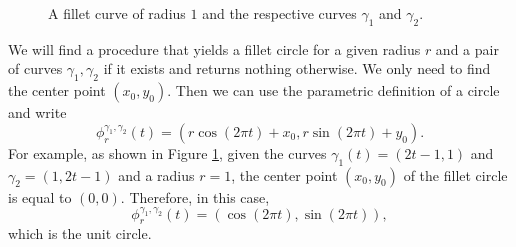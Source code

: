 \documentclass[a4paper, 11pt]{report}
\theoremstyle{definition}
\begin{document}
	\begin{figure}[H]
		\centering
		
		\caption{A fillet curve of radius $1$ and the respective curves $\gamma_1$ and $\gamma_2$.}
		\label{fig:verysimplefillet}
	\end{figure}

	We will find a procedure that yields a fillet circle for a given radius $r$ and a pair of curves $\gamma_1, \gamma_2$ if it exists and returns nothing otherwise. We only need to find the center point $(x_0, y_0)$. Then we can use the parametric definition of a circle and write
		$$ \phi^{\gamma_1, \gamma_2}_r(t) = (r \cos(2 \pi t) + x_0, r \sin(2 \pi t) + y_0).$$
	For example, as shown in Figure \ref{fig:verysimplefillet}, given the curves $\gamma_1(t) = (2t-1,1)$ and $\gamma_2 = (1,2t-1)$ and a radius $r = 1$, the center point $(x_0,y_0)$ of the fillet circle is equal to $(0,0)$. Therefore, in this case,
		$$ \phi^{\gamma_1, \gamma_2}_r(t) = (\cos(2\pi t), \sin(2\pi t)), $$
	which is the unit circle.
\end{document}
